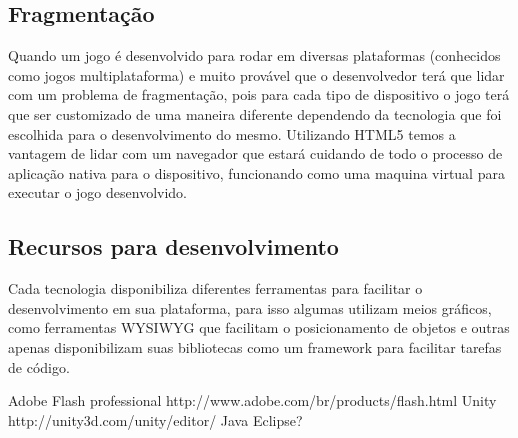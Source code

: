 
\subsection{Fragmentação}

Quando um jogo é desenvolvido para rodar em diversas plataformas
(conhecidos como jogos multiplataforma) e muito provável que o
desenvolvedor terá que lidar com um problema de fragmentação, pois
para cada tipo de dispositivo o jogo terá que ser customizado de uma
maneira diferente dependendo da tecnologia que foi escolhida para o
desenvolvimento do mesmo.
Utilizando HTML5 temos a vantagem de lidar com um navegador que estará
cuidando de todo o processo de aplicação nativa para o dispositivo,
funcionando como uma maquina virtual para executar o jogo
desenvolvido.


\subsection{Recursos para desenvolvimento}

Cada tecnologia disponibiliza diferentes ferramentas para facilitar o
desenvolvimento em sua plataforma, para isso algumas utilizam meios
gráficos, como ferramentas WYSIWYG que facilitam o posicionamento de
objetos e outras apenas disponibilizam suas bibliotecas como um
framework para facilitar tarefas de código.

Adobe Flash professional http://www.adobe.com/br/products/flash.html
Unity http://unity3d.com/unity/editor/
Java Eclipse?
